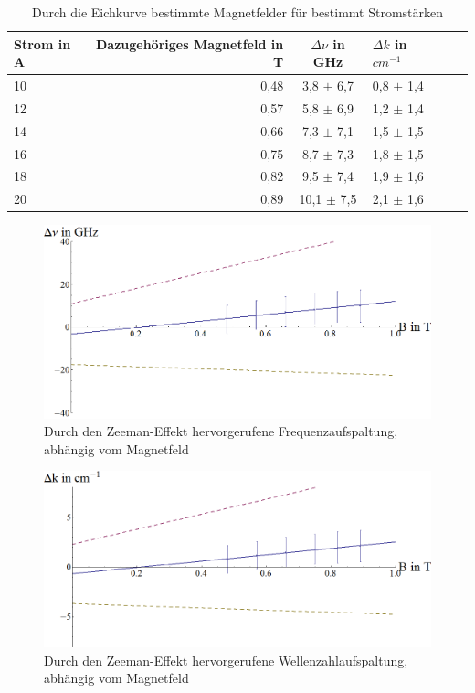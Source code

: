 \documentclass[10pt,a4paper]{article}
\begin{document}
\begin{table}[h!]
	\centering
	\begin{tabular}{|l|r|c|lrp{16cm}}\hline
		Strom in A & Dazugehöriges Magnetfeld in T & $\Delta \nu$ in GHz & $\Delta k$ in $cm^{-1}$ \\\hline
		10 & 0,48 & 3,8 $\pm$ 6,7& 0,8 $\pm$ 1,4\\
		12 & 0,57 & 5,8  $\pm$ 6,9& 1,2 $\pm$ 1,4\\
		14 & 0,66 & 7,3 $\pm$ 7,1& 1,5 $\pm$ 1,5\\
		16 & 0,75 & 8,7 $\pm$ 7,3& 1,8 $\pm$ 1,5\\
		18 & 0,82 & 9,5 $\pm$ 7,4& 1,9 $\pm$ 1,6\\
		20 & 0,89 & 10,1 $\pm$ 7,5& 2,1 $\pm$ 1,6\\\hline
	\end{tabular}
	\caption{Durch die Eichkurve bestimmte Magnetfelder für bestimmt Stromstärken}
	\label{gemessene_frequenzaufspaltungen}
\end{table}



\begin{figure}[h]
	\includegraphics[scale = 0.5]{frequenzaufspaltung.png}
	\centering
	\caption{Durch den Zeeman-Effekt hervorgerufene Frequenzaufspaltung, abhängig vom Magnetfeld}
	\label{diagramm_aufspaltung}
\end{figure}
\begin{figure}[h]
	\includegraphics[scale = 0.5]{wellenzahlaufspaltung.png}
	\centering
	\caption{Durch den Zeeman-Effekt hervorgerufene Wellenzahlaufspaltung, abhängig vom Magnetfeld}
	\label{diagramm_aufspaltung_wellenzahl}
\end{figure}
\end{document}
